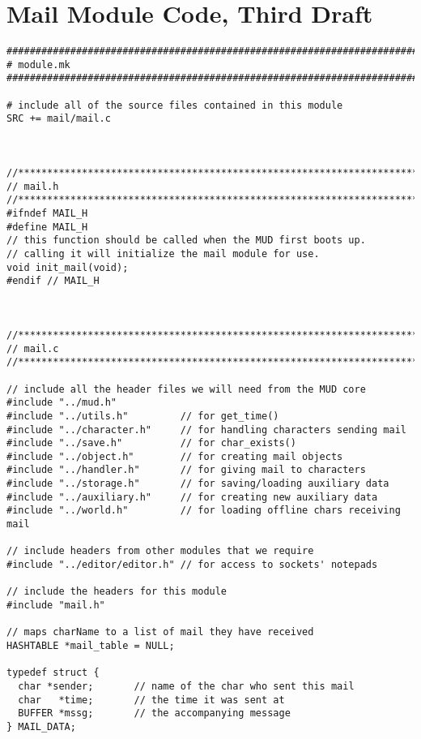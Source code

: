 \documentclass[12pt]{article}
\begin{document}
\newpage \section{Mail Module Code, Third Draft}
{\bf \begin{verbatim}
################################################################################
# module.mk
################################################################################

# include all of the source files contained in this module
SRC += mail/mail.c



//*****************************************************************************
// mail.h
//*****************************************************************************
#ifndef MAIL_H
#define MAIL_H
// this function should be called when the MUD first boots up.
// calling it will initialize the mail module for use.
void init_mail(void);
#endif // MAIL_H



//*****************************************************************************
// mail.c
//*****************************************************************************

// include all the header files we will need from the MUD core
#include "../mud.h"
#include "../utils.h"         // for get_time()
#include "../character.h"     // for handling characters sending mail
#include "../save.h"          // for char_exists()
#include "../object.h"        // for creating mail objects
#include "../handler.h"       // for giving mail to characters
#include "../storage.h"       // for saving/loading auxiliary data
#include "../auxiliary.h"     // for creating new auxiliary data
#include "../world.h"         // for loading offline chars receiving mail

// include headers from other modules that we require
#include "../editor/editor.h" // for access to sockets' notepads

// include the headers for this module
#include "mail.h"

// maps charName to a list of mail they have received
HASHTABLE *mail_table = NULL;

typedef struct {
  char *sender;       // name of the char who sent this mail
  char   *time;       // the time it was sent at
  BUFFER *mssg;       // the accompanying message
} MAIL_DATA;


\end{verbatim}}
\end{document}
